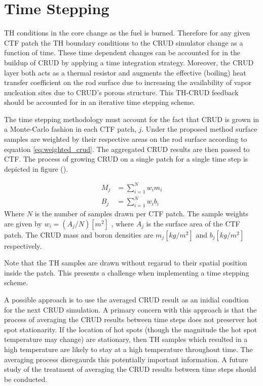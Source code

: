 \section{Time Stepping}

TH conditions in the core change as the fuel is burned.  Therefore for any given CTF patch the TH boundary conditions to the CRUD simulator change as a function of time.  These time dependent changes can be accounted for in the buildup of CRUD by applying a time integration strategy.  Moreover, the CRUD layer both acts as a thermal resistor and augments the effective (boiling) heat transfer coefficient on the rod surface due to increasing the availability of vapor nucleation sites due to CRUD's porous structure.  This TH-CRUD feedback should be accounted for in an iterative time stepping scheme.

The time stepping methodology must account for the fact that CRUD is grown in a Monte-Carlo fashion in each CTF patch, $j$.  Under the proposed method surface samples are weighted by their respective areas on the rod surface according to equation \ref{eq:weighted_crud}.  The aggregated CRUD results are then passed to CTF. The process of growing CRUD on a single patch for a single time step is depicted in figure ().

\begin{eqnarray}
M_j &= \sum_{i=1}^N w_i m_{i} \\
B_j &= \sum_{i=1}^N w_i b_{i}
\label{eq:weighted_crud}
\end{eqnarray}
Where $N$ is the number of samples drawn per CTF patch.  The sample weights are given by $w_i = (A_j / N) [m^2]$ , where $A_j$ is the surface area of the CTF patch.  The CRUD mass and boron densities are $m_j[kg/m^2]$ and $b_j [kg/m^2]$ respectively.

Note that the TH samples are drawn without regarud to their spatial position inside the patch.  This presents a challenge when implementing a time stepping scheme.

A possible approach is to use the averaged CRUD result as an inidial condtion for the next CRUD simulation.
A primary concern with this approach is that the process of averaging the CRUD results between time steps does not preserver hot spot stationarity.  If the location of hot spots (though the magnitude the hot spot temperature may change) are stationary, then TH samples which resulted in a high temperature are likely to stay at a high temperature throughout time.  The averaging process disregaurds this potentially important information.  A future study of the treatment of averaging the CRUD results between time steps should be conducted. 

